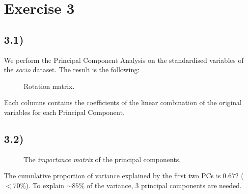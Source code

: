 \documentclass[a4paper,11pt,oneside]{report}
\begin{document}
\newpage
\section*{Exercise 3}
\subsection*{3.1)}
	We perform the Principal Component Analysis on the standardised variables of the \textit{socio} dataset. The result is the following:
	\begin{figure}[H]
	\centering
	\begin{varwidth}{\linewidth}
	
	\end{varwidth}
	\caption{Rotation matrix.}
	\label{fig:rot}
	\end{figure}
	Each columns contains the coefficients of the linear combination of the original variables for each Principal Component.

\subsection*{3.2)}
	\begin{figure}[H]
	\centering
	\begin{varwidth}{\linewidth}
	
	\end{varwidth}
	\caption{The \textit{importance matrix} of the principal components.}
	\end{figure}
	The cumulative proportion of variance explained by the first two PCs is $0.672$ ($< 70\%$). To explain $\sim 85\%$ of the variance, 3 principal components are needed.
\end{document}

